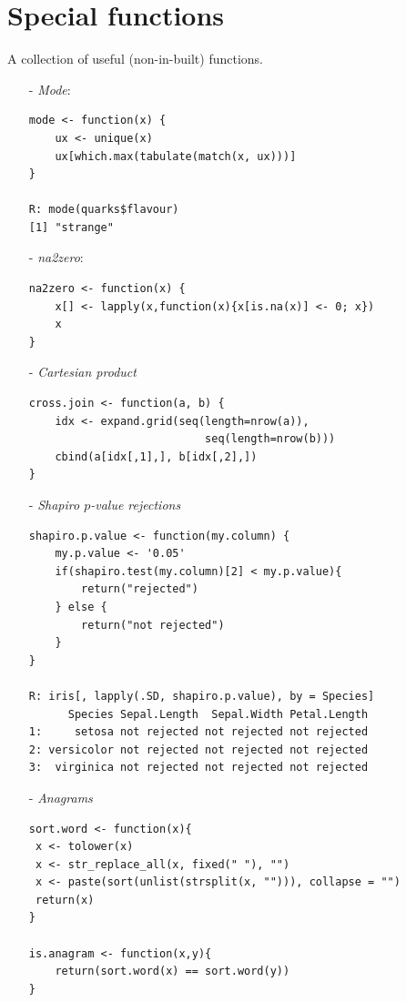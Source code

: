 \renewcommand{\thesection}{A}
\chapter{Special functions}\label{sec: functions}
A collection of useful (non-in-built) functions.
\bigskip

\begin{itemize}
\item[-] \emph{Mode}:
\begin{verbatim}
mode <- function(x) {
	ux <- unique(x)
	ux[which.max(tabulate(match(x, ux)))]
}
	
R: mode(quarks$flavour)
[1] "strange"
\end{verbatim}
	
\item[-]\emph{na2zero}:
\begin{verbatim}
na2zero <- function(x) {
	x[] <- lapply(x,function(x){x[is.na(x)] <- 0; x})
	x
}
\end{verbatim}
	
\item[-]\emph{Cartesian product}
\begin{verbatim}
cross.join <- function(a, b) {
	idx <- expand.grid(seq(length=nrow(a)), 
                           seq(length=nrow(b)))
	cbind(a[idx[,1],], b[idx[,2],])
}
\end{verbatim}
	
 \item[-]\emph{Shapiro $p$-value rejections}
\begin{verbatim}
shapiro.p.value <- function(my.column) {
	my.p.value <- '0.05'
	if(shapiro.test(my.column)[2] < my.p.value){
		return("rejected")
	} else {
		return("not rejected")
	}
}
	
R: iris[, lapply(.SD, shapiro.p.value), by = Species]
      Species Sepal.Length  Sepal.Width Petal.Length   
1:     setosa not rejected not rejected not rejected 
2: versicolor not rejected not rejected not rejected 
3:  virginica not rejected not rejected not rejected 
\end{verbatim}
 \item[-] \emph{Anagrams}
\begin{verbatim}
sort.word <- function(x){
 x <- tolower(x)
 x <- str_replace_all(x, fixed(" "), "")    
 x <- paste(sort(unlist(strsplit(x, ""))), collapse = "") 
 return(x)
}

is.anagram <- function(x,y){
    return(sort.word(x) == sort.word(y))
}


\end{verbatim}
\end{itemize}

